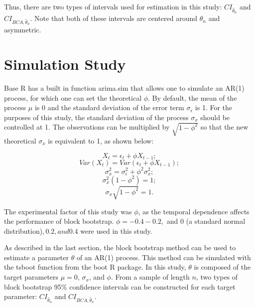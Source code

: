 \documentclass[12pt, letterpaper, titlepage]{article}
\begin{document}
Thus, there are two types of intervals used for estimation in this study: $CI_{\hat{\theta}_{n}}$ and $CI_{BCA, \hat{\theta}_{n}}$. Note that both of these intervals are centered around $\hat{\theta}_{n}$ and asymmetric. 


\section{Simulation Study}
\label{sec:simstudy}





Base R has a built in function arima.sim that allows one to simulate an AR(1) process, for which one can set the theoretical $\phi$. By default, the mean of the process $\mu$ is 0 and the standard deviation of the error term $\sigma_{\epsilon}$ is 1. For the purposes of this study, the standard deviation of the process $\sigma_{x}$ should be controlled at 1. The observations can be multiplied by $\sqrt{1 - \phi^2}$ so that the new theoretical $\sigma_{x}$ is equivalent to 1, as shown below:

\[X_{t} = \epsilon_{t} + \phi X_{t-1};\]
\[Var(X_{t}) = Var(\epsilon_{t} + \phi X_{t-1});\]
\[\sigma^2_{x} = \sigma^2_{\epsilon} + \phi^2 \sigma^2_{x};\]
\[\sigma^2_{x}(1 - \phi^2) = 1;\]
\[\sigma_{x}\sqrt{1 - \phi^2} = 1.\]

The experimental factor of this study was $\phi$, as the temporal dependence affects the performance of block bootstrap. $\phi = -0.4 -0.2,$ and $0$ (a standard normal distribution)$, 0.2, and 0.4$ were used in this study. 

As described in the last section, the block bootstrap method can be used to estimate a parameter $\theta$ of an AR(1) process. This method can be simulated with the tsboot function from the boot R package. In this study, $\theta$ is composed of the target parameters $\mu = 0$, $\sigma_{x}$, and $\phi$. From a sample of length $n$, two types of block bootstrap 95\% confidence intervals can be constructed for each target parameter: $CI_{\hat{\theta}_{n}}$ and $CI_{BCA, \hat{\theta}_{n}}$.
\end{document}
